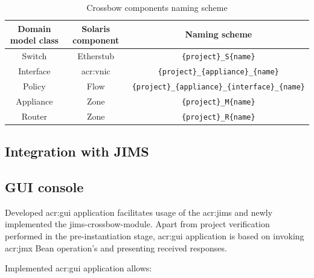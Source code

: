 \documentclass[11pt,openany]{book}
\begin{document}
        \begin{table}[H]
          \centering

          \begin{tabular}{|c|c|c|}
            \hline
            Domain model class & Solaris component & Naming scheme                                                \\
            \hline \hline
            Switch             & Etherstub         & \texttt{\{project\}\_S\{name\}}                              \\
            \hline
            Interface          & \gls{acr:vnic}    & \texttt{\{project\}\_\{appliance\}\_\{name\}}                \\
            \hline
            Policy             & Flow              & \texttt{\{project\}\_\{appliance\}\_\{interface\}\_\{name\}} \\
            \hline
            Appliance          & Zone              & \texttt{\{project\}\_M\{name\}}                              \\
            \hline
            Router             & Zone              & \texttt{\{project\}\_R\{name\}}                              \\
            \hline
          \end{tabular}

          \caption{Crossbow components naming scheme}
          \label{tab:impl:naming}
        \end{table}


      \subsection{Integration with JIMS}


      \subsection{GUI console}
      \label{ssec:impl:gui}
		
        Developed \gls{acr:gui} application facilitates usage of the \gls{acr:jims} and newly implemented the
        jims-crossbow-module. Apart from project verification performed in the pre-instantiation stage, \gls{acr:gui}
        application is based on invoking \gls{acr:jmx} Bean operation's and presenting received responses.

        Implemented \gls{acr:gui} application allows:
\end{document}
